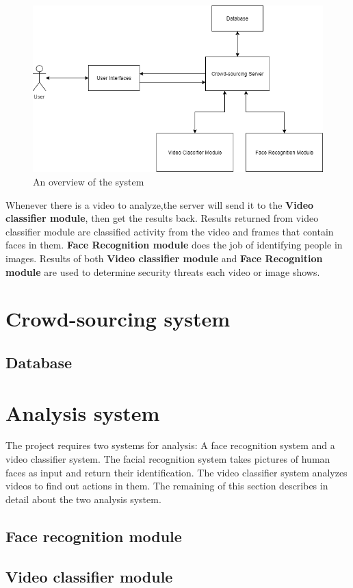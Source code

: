 \begin{center}
    \begin{figure}[H]
    \centering
    \includegraphics[width=1\columnwidth]{images/chap3/system_overview_basic.png}
    \caption{An overview of the system}
    \label{chap3:system_overview_basic}
    \end{figure}
\end{center}
Whenever there is a video to analyze,the server will send it to the \textbf{Video classifier module}, then get the results back. Results returned from video classifier module are classified activity from the video and frames that contain faces in them. \textbf{Face Recognition module} does the job of identifying people in images. Results of both \textbf{Video classifier module} and \textbf{Face Recognition module} are used to determine security threats each video or image shows.
\section{Crowd-sourcing system}
\subsection{Database}
\section{Analysis system}
The project requires two systems for analysis: A face recognition system and a video classifier system. The facial recognition system takes pictures of human faces as input and return their identification. The video classifier system analyzes videos to find out actions in them. The remaining of this section describes in detail about the two analysis system.
\subsection{Face recognition module}
\subsection{Video classifier module}


